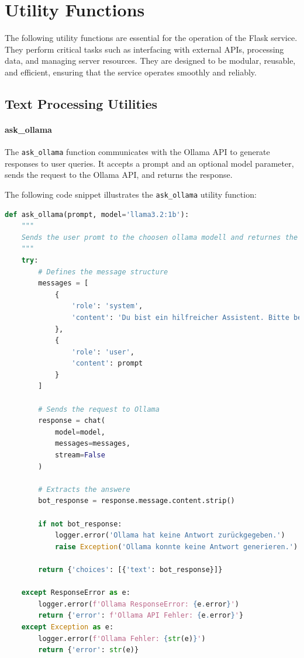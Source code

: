 
\section{Utility Functions}

The following utility functions are essential for the operation of the Flask service. 
They perform critical tasks such as interfacing with external APIs, processing data, and managing server resources.
They are designed to be modular, reusable, and efficient, ensuring that the service operates smoothly and reliably.

\subsection{Text Processing Utilities}

\paragraph{ask\_ollama}

The \texttt{ask\_ollama} function communicates with the Ollama API to generate responses to user queries.
It accepts a prompt and an optional model parameter, sends the request to the Ollama API, and returns the response.

The following code snippet illustrates the \texttt{ask\_ollama} utility function:

\begin{lstlisting}[language=Python]
    def ask_ollama(prompt, model='llama3.2:1b'):
    """
    Sends the user promt to the choosen ollama modell and returnes the answere
    """
    try:
        # Defines the message structure
        messages = [
            {
                'role': 'system',
                'content': 'Du bist ein hilfreicher Assistent. Bitte beantworte die folgende Benutzeranfrage:'
            },
            {
                'role': 'user',
                'content': prompt
            }
        ]

        # Sends the request to Ollama
        response = chat(
            model=model,
            messages=messages,
            stream=False
        )

        # Extracts the answere
        bot_response = response.message.content.strip()

        if not bot_response:
            logger.error('Ollama hat keine Antwort zurückgegeben.')
            raise Exception('Ollama konnte keine Antwort generieren.')

        return {'choices': [{'text': bot_response}]}

    except ResponseError as e:
        logger.error(f'Ollama ResponseError: {e.error}')
        return {'error': f'Ollama API Fehler: {e.error}'}
    except Exception as e:
        logger.error(f'Ollama Fehler: {str(e)}')
        return {'error': str(e)}
\end{lstlisting}



